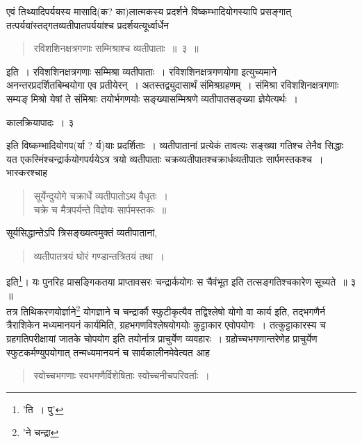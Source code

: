 \documentclass[11pt, openany]{book}
\begin{document}
एवं तिथ्यादिपर्ययस्य मासादि(क? का)लात्मकस्य प्रदर्शने विष्कम्भादियोगस्यापि प्रसङ्गात् तत्पर्ययांस्तद्गतव्यतीपातपर्ययांश्च
प्रदर्शयत्यूर्ध्वार्धेन\textendash

\begin{quote} 
{\ab रविशशिनक्षत्रगणाः सम्मिश्राश्च व्यतीपाताः~॥~३~॥}
\end{quote}
इति~। रविशशिनक्षत्रगणाः सम्मिश्रा व्यतीपाताः~। रविशशिनक्षत्रगणयोगा इत्युच्यमाने अनन्तरप्रदर्शितबिम्बयोगा एव प्रतीयेरन्~। अतस्तद्व्युदासार्थं संमिश्रग्रहणम्~। संमिश्रा रविशशिनक्षत्रगणाः सम्यङ् मिश्रो येषां ते संमिश्राः तयोर्भगणयोः सङ्ख्यासम्मिश्रणे व्यतीपातसङ्ख्या
ज्ञेयेत्यर्थः~।
 
\newpage

\hspace{4cm}कालक्रियापादः~। \hspace{4cm}३

\vspace{0.3cm} \noindent इति विष्कम्भादियोगप(र्या ? र्य)याः प्रदर्शिताः~। व्यतीपातानां प्रत्येकं
तावत्यः सङ्ख्या गतिश्च तेनैव सिद्धाः यत एकस्मिंश्चन्द्रार्कयोगपर्ययेऽत्र त्रयो
व्यतीपाताः चक्रव्यतीपातश्चक्रार्धव्यतीपातः सार्पमस्तकश्च~। भास्करश्चाह\textendash

\begin{quote}
{\qt सूर्येन्दुयोगे चक्रार्धे व्यतीपातोऽथ वैधृतः~।\\
चक्रे च मैत्रपर्यन्ते विज्ञेयः सार्पमस्तकः~॥}
\end{quote}

\noindent सूर्यसिद्धान्तेऽपि त्रिसङ्ख्यत्वमुक्तं व्यतीपातानां,

\begin{quote} 
{\qt व्यतीपातत्रयं घोरं गण्डान्तत्रितयं तथा~।} 
\end{quote} 
इति\renewcommand{\thefootnote}{१}\footnote{'ति~। पु'}। यः पुनरिह प्रासङ्गिकतया प्राप्तावसरः चन्द्रार्कयोगः स
चैवंभूत इति तत्सङ्गतिश्चकारेण सूच्यते~॥ ३ ॥ \\

तत्र तिथिकरणयोर्ज्ञाने\renewcommand{\thefootnote}{२}\footnote{'ने चन्द्रा} योगज्ञाने च चन्द्रार्कौ स्फुटीकृत्यैव
तद्विश्लेषो योगो वा कार्य इति, तद्भगणैर्न त्रैराशिकेन मध्यमानयनं कार्यमिति, ग्रहभगणविश्लेषयोगयोः कुट्टाकार एवोपयोगः~। तत्कुट्टाकारस्य च ग्रहगतिपरीक्षायां जातके चोपयोग इति तयोर्नात्र प्राचुर्येण व्यवहारः~। ग्रहोच्चभगणान्तरेणेह प्राचुर्येण स्फुटकर्मण्युपयोगात् तन्मध्यमानयनं च सार्वकालीनमेवेत्यत आह\textendash

\begin{quote}
{\ab स्वोच्चभगणाः स्वभगणैर्विशेषिताः स्वोच्चनीचपरिवर्ताः~।}
\end{quote}
\end{document}
